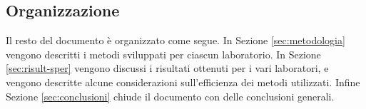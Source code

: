 \subsection{Organizzazione}
Il resto del documento \`e organizzato come segue. In Sezione \ref{sec:metodologia} vengono descritti i metodi sviluppati per ciascun laboratorio. In Sezione \ref{sec:risult-sper} vengono discussi i risultati ottenuti per i vari laboratori, e vengono descritte alcune considerazioni sull'efficienza dei metodi utilizzati. 
Infine Sezione \ref{sec:conclusioni} chiude il documento con delle conclusioni generali.

%
